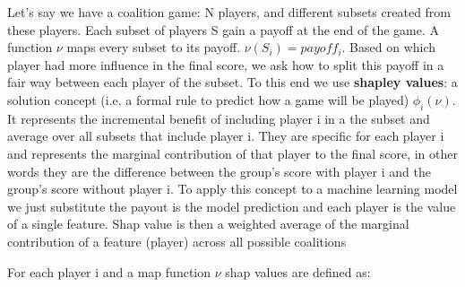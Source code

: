 \documentclass[a4paper,11pt]{article}
\begin{document}
Let's say we have a coalition game: N players, and different subsets created from these players. Each subset of players S gain a payoff at the end of the game. A function $\nu$ maps every subset to its payoff. $\nu(S_i) = payoff_i$. Based on which player had more influence in the final score, we ask how to split this payoff in a fair way between each player of the subset.
To this end we use \textbf{shapley values}: a solution concept (i.e. a formal rule to predict how a game will be played) $\phi_i(\nu)$. It represents the incremental benefit of including player i in a the subset and average over all subsets that include player i.
They are specific for each player i and represents the marginal contribution of that player to the final score, in other words they are the difference between the group's score with player i and the group's score without player i.
To apply this concept to a machine learning model we just substitute the payout is the model prediction and each player is the value of a single feature.
Shap value is then a weighted average of the marginal contribution of a feature (player) across all possible coalitions

For each player i and a map function $\nu$ shap values are defined as:
\end{document}
